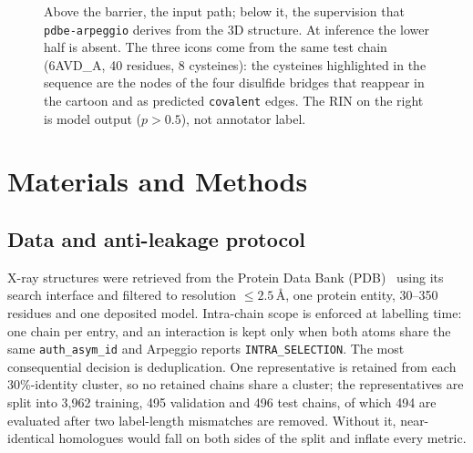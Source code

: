 \documentclass[12pt]{article}
\begin{document}
\begin{figure}[tb]
{}
  \caption{Above the barrier, the input path; below it, the supervision that
  \texttt{pdbe-arpeggio} derives from the 3D structure. At inference the lower half is
  absent. The three icons come from the same
  test chain (6AVD\_A, 40 residues, 8 cysteines): the cysteines highlighted in the
  sequence are the nodes of the four disulfide bridges that reappear in the
  cartoon and as predicted \texttt{covalent} edges. The RIN on the right is model
  output ($p>0.5$), not annotator label.}
  \label{fig:pipeline}
\end{figure}

\section{Materials and Methods}
\label{sec:methods}

\subsection{Data and anti-leakage protocol}
\label{sec:dataset}

X-ray structures were retrieved from the Protein Data Bank
(PDB)~\cite{berman2000pdb} using its search interface and filtered to resolution
$\leq 2.5$\,\AA, one protein entity, 30--350 residues and one deposited model. Intra-chain scope is enforced at labelling time: one chain per entry, and an
interaction is kept only when both atoms share the same \texttt{auth\_asym\_id} and
Arpeggio reports \texttt{INTRA\_SELECTION}. The most consequential decision is
deduplication. One representative is retained from each 30\%-identity cluster, so no
retained chains share a cluster; the representatives are split into 3,962 training, 495
validation and 496 test chains, of which 494 are evaluated after two label-length
mismatches are removed. Without it, near-identical
homologues would fall on both sides of the split and inflate every metric.
\end{document}
